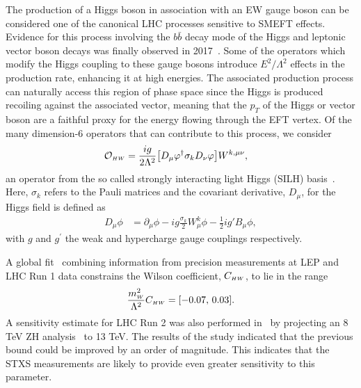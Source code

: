 The production of a Higgs boson in association with an EW gauge boson can be considered one of the canonical LHC processes sensitive to SMEFT effects. Evidence for this process involving the $b\bar{b}$ decay mode of the Higgs and leptonic vector boson decays was finally observed in 2017~\cite{Aaboud:2017xsd,Sirunyan:2017elk}. Some of the operators which modify the Higgs coupling to these gauge bosons introduce $E^2/\Lambda^2$ effects in the production rate, enhancing it at high energies.
The associated production process can naturally access this region of phase space since the Higgs is produced recoiling against the associated vector, meaning that the $p_T$ of the Higgs or vector boson are a faithful proxy for the energy flowing through the EFT vertex. Of the many dimension-6 operators that can contribute to this process, we consider 
\begin{align}
    \mathcal{O}_{\scriptscriptstyle HW} &= 
    \frac{ig}{2\Lambda^2} \big[D_\mu \varphi^\dag \sigma_{k} D_\nu \varphi\big] 
    W^{k,\mu \nu},
\end{align}
an operator from the so called strongly interacting light Higgs (SILH) basis~\cite{Giudice:2007fh,Contino:2013kra}. Here, $\sigma_{k}$ refers to the Pauli matrices and the covariant derivative, $D_\mu$, for the Higgs field is defined as
\begin{align}
    D_\mu\phi &= \partial_\mu \phi -  i g \frac{\sigma_{k}}{2} W_\mu^k \phi - \frac12 i g' B_\mu \phi,
\end{align}
with $g$ and $g^\prime$ the weak and hypercharge gauge couplings respectively.

A global fit~\cite{Ellis:2014jta} combining information from precision measurements at LEP and LHC Run 1 data constrains the Wilson coefficient, $C_{\scriptscriptstyle HW}$, to lie in the range 
\begin{align}
    \frac{m_{\scriptscriptstyle W}^2}{\Lambda^2}C_{\scriptscriptstyle HW} = [-0.07,\,0.03].
\end{align}
A sensitivity estimate for LHC Run 2 was also performed in~\cite{Degrande:2016dqg} by projecting an 8 TeV ZH analysis~\cite{TheATLAScollaboration:2013lia} to 13 TeV. The results of the study indicated that the previous bound could be improved by an order of magnitude. This indicates that the STXS measurements are likely to provide even greater sensitivity to this parameter.

